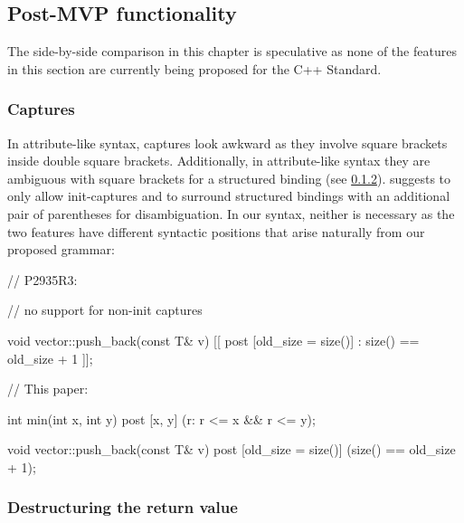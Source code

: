 \subsection{Post-MVP functionality}

The side-by-side comparison in this chapter is speculative as none of the features in this section are currently being proposed for the C++ Standard.

\subsubsection{Captures}
\label{subsubsec:comp_captures}

In attribute-like syntax, captures look awkward as they involve square brackets inside double square brackets. Additionally, in attribute-like syntax they are ambiguous with square brackets for a structured binding (see \ref{subsubsec:struct}). \cite{P2935R3} suggests to only allow init-captures and to surround structured bindings with an additional pair of parentheses for disambiguation. In our syntax, neither is necessary as the two features have different syntactic positions that arise naturally from our proposed grammar:

\begin{minipage}[t]{8cm}
\begin{codeblock}
// P2935R3:

// no support for non-init captures


void vector::push_back(const T& v)
  [[ post [old_size = size()]
    : size() == old_size + 1 ]];
    
\end{codeblock}
\end{minipage}
\begin{minipage}[t]{8cm}
\begin{codeblock}
// This paper:
    
int min(int x, int y)
  post [x, y] (r: r <= x && r <= y);
  
void vector::push_back(const T& v)
  post [old_size = size()] 
    (size() == old_size + 1);
\end{codeblock}
\end{minipage}


\subsubsection{Destructuring the return value}
\label{subsubsec:struct}

